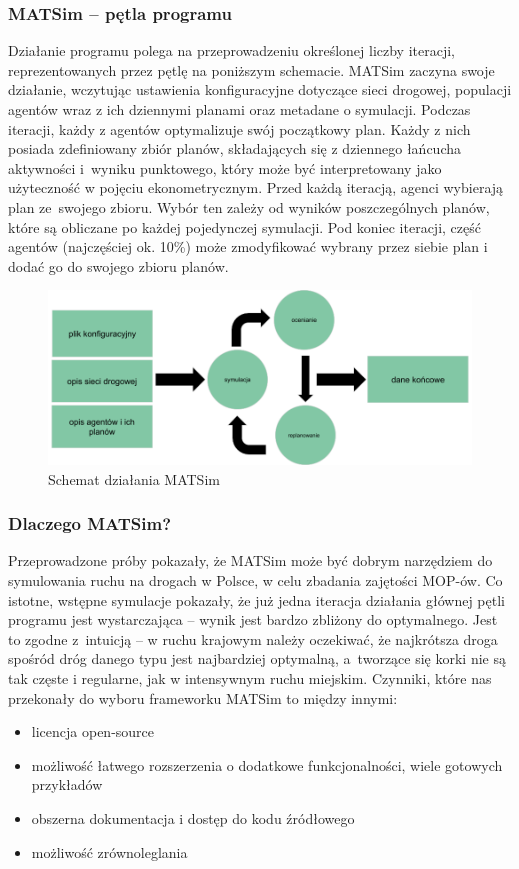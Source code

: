 \subsubsection{MATSim -- pętla programu}
Działanie programu polega na przeprowadzeniu określonej liczby iteracji, reprezentowanych przez pętlę na poniższym schemacie. MATSim zaczyna swoje działanie, wczytując ustawienia konfiguracyjne dotyczące sieci drogowej, populacji agentów wraz z ich dziennymi planami oraz metadane o symulacji. Podczas iteracji, każdy z agentów optymalizuje swój początkowy plan. Każdy z nich posiada zdefiniowany zbiór planów, składających się z dziennego łańcucha aktywności i~wyniku punktowego, który może być interpretowany jako użyteczność w pojęciu ekonometrycznym. Przed każdą iteracją, agenci wybierają plan ze~swojego zbioru. Wybór ten zależy od wyników poszczególnych planów, które są obliczane po każdej pojedynczej symulacji. Pod koniec iteracji, część agentów (najczęściej ok. 10\%) może zmodyfikować wybrany przez siebie plan i dodać go do swojego zbioru planów. 
    \begin{figure}[h]
        \caption{Schemat działania MATSim}
        \includegraphics[width=\textwidth]{images/mopsim/matsim-workflow.png}
    \end{figure}
\newpage
\subsubsection{Dlaczego MATSim?}
Przeprowadzone próby pokazały, że MATSim może być dobrym narzędziem do symulowania ruchu na drogach w Polsce, w celu zbadania zajętości MOP-ów. Co istotne, wstępne symulacje pokazały, że już jedna iteracja działania głównej pętli programu jest wystarczająca -- wynik jest bardzo zbliżony do optymalnego. Jest to zgodne z~intuicją -- w ruchu krajowym należy oczekiwać, że najkrótsza droga spośród dróg danego typu jest najbardziej optymalną, a~tworzące się korki nie są tak częste i regularne, jak w intensywnym ruchu miejskim. Czynniki, które nas przekonały do wyboru frameworku MATSim to między innymi:
\begin{itemize}
\item licencja open-source
\item możliwość łatwego rozszerzenia o dodatkowe funkcjonalności, wiele gotowych przykładów
\item obszerna dokumentacja i dostęp do kodu źródłowego
\item możliwość zrównoleglania
\end{itemize}

